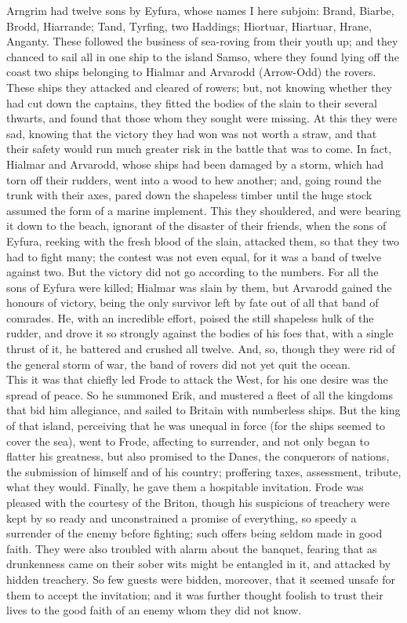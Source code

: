 \documentclass[10pt,a4paper]{report}
\begin{document}
Arngrim had twelve sons by Eyfura, whose names I here subjoin: Brand, Biarbe, Brodd, Hiarrande; Tand, Tyrfing, two Haddings; Hiortuar, Hiartuar, Hrane, Anganty. These followed the business of sea-roving from their youth up; and they chanced to sail all in one ship to the island Samso, where they found lying off the coast two ships belonging to Hialmar and Arvarodd (Arrow-Odd) the rovers. These ships they attacked and cleared of rowers; but, not knowing whether they had cut down the captains, they fitted the bodies of the slain to their several thwarts, and found that those whom they sought were missing. At this they were sad, knowing that the victory they had won was not worth a straw, and that their safety would run much greater risk in the battle that was to come. In fact, Hialmar and Arvarodd, whose ships had been damaged by a storm, which had torn off their rudders, went into a wood to hew another; and, going round the trunk with their axes, pared down the shapeless timber until the huge stock assumed the form of a marine implement. This they shouldered, and were bearing it down to the beach, ignorant of the disaster of their friends, when the sons of Eyfura, reeking with the fresh blood of the slain, attacked them, so that they two had to fight many; the contest was not even equal, for it was a band of twelve against two. But the victory did not go according to the numbers. For all the sons of Eyfura were killed; Hialmar was slain by them, but Arvarodd gained the honours of victory, being the only survivor left by fate out of all that band of comrades. He, with an incredible effort, poised the still shapeless hulk of the rudder, and drove it so strongly against the bodies of his foes that, with a single thrust of it, he battered and crushed all twelve. And, so, though they were rid of the general storm of war, the band of rovers did not yet quit the ocean.\\

This it was that chiefly led Frode to attack the West, for his one desire was the spread of peace. So he summoned Erik, and mustered a fleet of all the kingdoms that bid him allegiance, and sailed to Britain with numberless ships. But the king of that island, perceiving that he was unequal in force (for the ships seemed to cover the sea), went to Frode, affecting to surrender, and not only began to flatter his greatness, but also promised to the Danes, the conquerors of nations, the submission of himself and of his country; proffering taxes, assessment, tribute, what they would. Finally, he gave them a hospitable invitation. Frode was pleased with the courtesy of the Briton, though his suspicions of treachery were kept by so ready and unconstrained a promise of everything, so speedy a surrender of the enemy before fighting; such offers being seldom made in good faith. They were also troubled with alarm about the banquet, fearing that as drunkenness came on their sober wits might be entangled in it, and attacked by hidden treachery. So few guests were bidden, moreover, that it seemed unsafe for them to accept the invitation; and it was further thought foolish to trust their lives to the good faith of an enemy whom they did not know.\\
\end{document}
